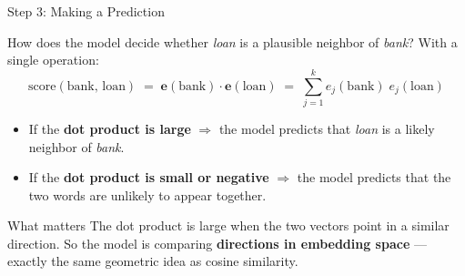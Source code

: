 \documentclass[aspectratio=169]{beamer}
\begin{document}
%
%
\begin{frame}{Step 3: Making a Prediction}

How does the model decide whether \emph{loan} is a plausible
neighbor of \emph{bank}?  With a single operation:
\[
  \text{score}(\text{bank},\, \text{loan})
  \;=\; \mathbf{e}(\text{bank}) \cdot \mathbf{e}(\text{loan})
  \;=\; \sum_{j=1}^{k} e_j(\text{bank})\; e_j(\text{loan})
\]

\begin{itemize}
  \item If the \textbf{dot product is large} $\Rightarrow$
        the model predicts that \emph{loan} is a likely
        neighbor of \emph{bank}.
  \item If the \textbf{dot product is small or negative}
        $\Rightarrow$ the model predicts that the two
        words are unlikely to appear together.
\end{itemize}

\begin{block}{What matters}
The dot product is large when the two vectors point
in a similar direction.  So the model is comparing
\textbf{directions in embedding space} --- exactly
the same geometric idea as cosine similarity.
\end{block}

\end{frame}
%
%
\end{document}
